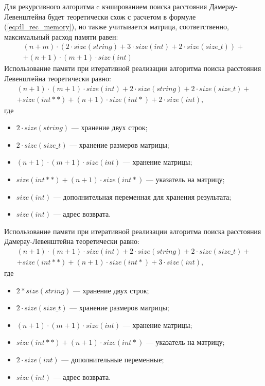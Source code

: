 Для рекурсивного алгоритма c кэшированием поиска расстояния Дамерау-Левенштейна будет теоретически схож с расчетом в формуле (\ref{eq:dl_rec_memory}), но также учитывается матрица, соответственно, максимальный расход памяти равен:
\begin{equation}
	\label{eq:dl_hash_memory}
	\begin{aligned}
		(n + m) \cdot (2 \cdot size(string) + 3 \cdot size(int) + 2 \cdot size(size\_t)) + \\
		+ (n + 1) \cdot (m + 1) \cdot size(int)
	\end{aligned}
\end{equation}
Использование памяти при итеративной реализации алгоритма поиска расстояния Левенштейна теоретически равно:
\begin{equation}
	\label{eq:lev_mtr_memory}
	\begin{aligned}
		(n + 1) \cdot (m + 1) \cdot size(int) + 2 \cdot size(string) + 2 \cdot size(size\_t) + \\
		+ size(int **) + (n + 1) \cdot size(int *) + 2 \cdot size(int),
	\end{aligned}
\end{equation}
где 
\begin{itemize}
	\item $2 \cdot size(string)$ --- хранение двух строк;
	\item $2 \cdot size(size\_t)$ --- хранение размеров матрицы;
	\item $(n + 1) \cdot (m + 1) \cdot size(int)$ --- хранение матрицы;
	\item $size(int **) + (n + 1) \cdot size(int *)$ --- указатель на матрицу;
	\item $size(int)$ --- дополнительная переменная для хранения результата;
	\item $size(int)$ --- адрес возврата.
\end{itemize}

Использование памяти при итеративной реализации алгоритма поиска расстояния Дамерау-Левенштейна теоретически равно:
\begin{equation}
	\label{eq:dl_mtr_memory}
	\begin{aligned}
		(n + 1) \cdot (m + 1) \cdot size(int) + 2 \cdot size(string) + 2 \cdot size(size\_t) + \\
		+ size(int **) + (n + 1) \cdot size(int *) + 3 \cdot size(int),
	\end{aligned}
\end{equation}
где 
\begin{itemize}
	\item $2 * size(string)$ --- хранение двух строк;
	\item $2 \cdot size(size\_t)$ --- хранение размеров матрицы;
	\item $(n + 1) \cdot (m + 1) \cdot size(int)$ --- хранение матрицы;
	\item $size(int **) + (n + 1) \cdot size(int *)$ --- указатель на матрицу;
	\item $2 \cdot size(int)$ --- дополнительные переменные;
	\item $size(int)$ --- адрес возврата.
\end{itemize}

